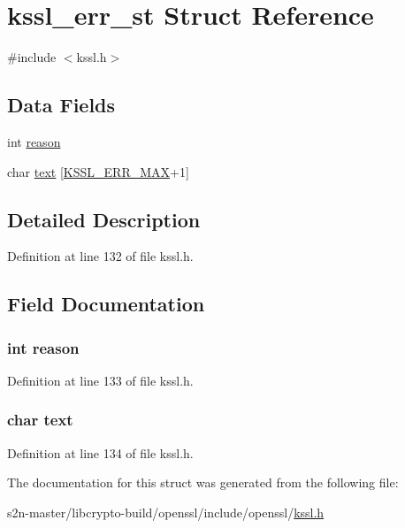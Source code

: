 \hypertarget{structkssl__err__st}{}\section{kssl\+\_\+err\+\_\+st Struct Reference}
\label{structkssl__err__st}


{\ttfamily \#include $<$kssl.\+h$>$}

\subsection*{Data Fields}
\begin{DoxyCompactItemize}
\item 
int \hyperlink{structkssl__err__st_abf19fa5e55c24b9556075afc7b302bbe}{reason}
\item 
char \hyperlink{structkssl__err__st_ac16025dff6435135b638e96456abf1c5}{text} \mbox{[}\hyperlink{ssl_2kssl_8h_a904998dd79bfc3ea4e36c4b0d30fd4da}{K\+S\+S\+L\+\_\+\+E\+R\+R\+\_\+\+M\+AX}+1\mbox{]}
\end{DoxyCompactItemize}


\subsection{Detailed Description}


Definition at line 132 of file kssl.\+h.



\subsection{Field Documentation}
\subsubsection[{\texorpdfstring{reason}{reason}}]{\setlength{\rightskip}{0pt plus 5cm}int reason}\hypertarget{structkssl__err__st_abf19fa5e55c24b9556075afc7b302bbe}{}\label{structkssl__err__st_abf19fa5e55c24b9556075afc7b302bbe}


Definition at line 133 of file kssl.\+h.

\subsubsection[{\texorpdfstring{text}{text}}]{\setlength{\rightskip}{0pt plus 5cm}char text}\hypertarget{structkssl__err__st_ac16025dff6435135b638e96456abf1c5}{}\label{structkssl__err__st_ac16025dff6435135b638e96456abf1c5}


Definition at line 134 of file kssl.\+h.



The documentation for this struct was generated from the following file\+:\begin{DoxyCompactItemize}
\item 
s2n-\/master/libcrypto-\/build/openssl/include/openssl/\hyperlink{include_2openssl_2kssl_8h}{kssl.\+h}\end{DoxyCompactItemize}
